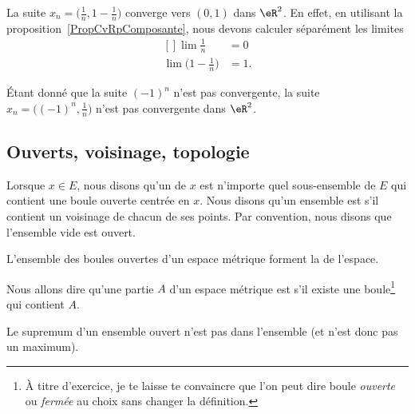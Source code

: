 \begin{example}
	La suite $x_n=\big( \frac{1}{ n },1-\frac{1}{ n } \big)$ converge vers $(0,1)$ dans $\eR^2$. En effet, en utilisant la proposition~\ref{PropCvRpComposante}, nous devons calculer séparément les limites
	\begin{equation}
		\begin{aligned}[]
			\lim\frac{1}{ n }&=0\\
			\lim\big( 1-\frac{1}{ n } \big)&=1.
		\end{aligned}
	\end{equation}
\end{example}

\begin{example}
	Étant donné que la suite $(-1)^n$ n'est pas convergente, la suite $x_n=\big( (-1)^n,\frac{1}{ n } \big)$ n'est pas convergente dans $\eR^2$.
\end{example}

\subsection{Ouverts, voisinage, topologie}

Lorsque $x\in E$, nous disons qu'un  de $x$ est n'importe quel sous-ensemble de $E$ qui contient une boule ouverte centrée en $x$. Nous disons qu'un ensemble est  s'il contient un voisinage de chacun de ses points. Par convention, nous disons que l'ensemble vide est ouvert.

\begin{definition}
L'ensemble des boules ouvertes d'un espace métrique forment la  de l'espace.
\end{definition}

Nous allons dire qu'une partie $A$ d'un espace métrique est  s'il existe une boule\footnote{À titre d'exercice, je te laisse te convaincre que l'on peut dire boule \emph{ouverte} ou \emph{fermée} au choix sans changer la définition.} qui contient $A$.

\begin{lemma}  \label{LemSupOuvPas}
Le supremum d'un ensemble ouvert n'est pas dans l'ensemble (et n'est donc pas un maximum).
\end{lemma}

